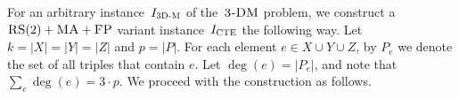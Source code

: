 %


For an arbitrary instance~$I_{\mathrm{\textsc{3D-M}}}$ of the~$\textsc{3-DM}$ problem, we construct a~$\textsc{RS}(2)+\textsc{MA}+\textsc{FP}$ variant instance~$I_{\mathrm{\textsc{CTE}}}$ the following way.
Let $k = |X|=|Y|=|Z|$ and $p = |P|$.
For each element $e\in X\cup Y\cup Z$, by $P_e$ we denote the set of all triples that contain $e$.
Let $\deg(e) = |P_e|$, and note that $\sum_e \deg(e) = 3\cdot p$.
We proceed with the construction as follows.
